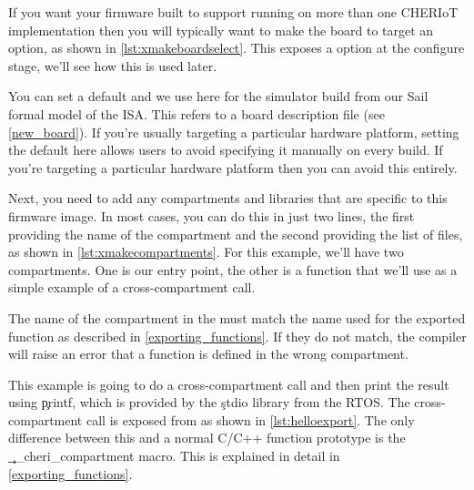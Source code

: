 If you want your firmware built to support running on more than one CHERIoT implementation then you will typically want to make the board to target an option, as shown in \ref{lst:xmakeboardselect}.
This exposes a  option at the configure stage, we'll see how this is used later.

\lualisting[filename=examples/hello_world/xmake.lua,marker=board,label=lst:xmakeboardselect,caption="Build system code for allowing the board to be selected at configure time"]{}

You can set a default and we use  here for the simulator build from our Sail formal model of the ISA.
This refers to a board description file (see \ref{new_board}).
If you're usually targeting a particular hardware platform, setting the default here allows users to avoid specifying it manually on every build.
If you're  targeting a particular hardware platform then you can avoid this entirely.

Next, you need to add any compartments and libraries that are specific to this firmware image.
In most cases, you can do this in just two lines, the first providing the name of the compartment and the second providing the list of files, as shown in \ref{lst:xmakecompartments}.
For this example, we'll have two compartments.
One is our entry point, the other is a function that we'll use as a simple example of a cross-compartment call.

\lualisting[filename=examples/hello_world/xmake.lua,marker=compartments,label=lst:xmakecompartments,caption="Build system code for building compartments"]{}

\begin{caution}
	The name of the compartment in the  must match the name used for the exported function as described in \ref{exporting_functions}.
	If they do not match, the compiler will raise an error that a function is defined in the wrong compartment.
\end{caution}

This example is going to do a cross-compartment call and then print the result using \c{printf}, which is provided by the \c{stdio} library from the RTOS.
The cross-compartment call is exposed from  as shown in \ref{lst:helloexport}.
The only difference between this and a normal C/C++ function prototype is the \c{__cheri_compartment} macro.
This is explained in detail in \ref{exporting_functions}.

\codelisting[filename=examples/hello_world/hello.h,marker=export,label=lst:helloexport,caption="Exporting a function for use by other compartments"]{}

